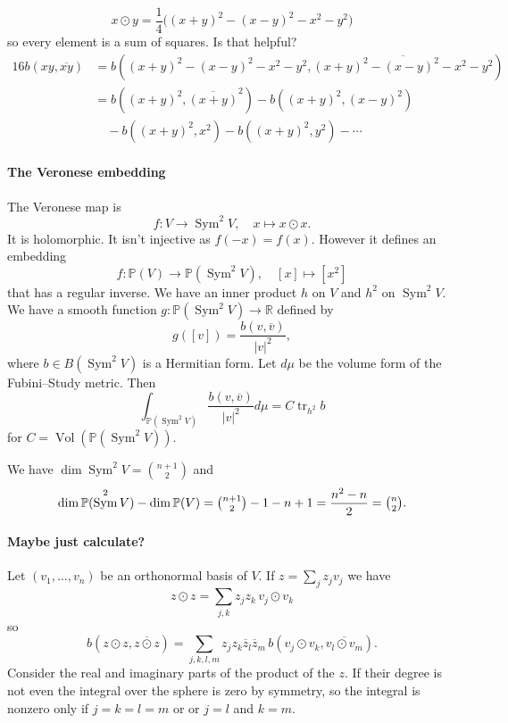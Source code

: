 \documentclass[11pt]{article}
\theoremstyle{definition}
\newcommand{\kk}[1]{\mathbb{#1}}
\def\ov#1{\overline{#1}}
\DeclareMathOperator{\Vol}{Vol}
\DeclareMathOperator{\Sym}{Sym}
\DeclareMathOperator{\tr}{tr}
\begin{document}
$$
x \odot y
= \frac14 \bigl( (x + y)^2 - (x - y)^2 - x^2 - y^2 \bigr)
$$
so every element is a sum of squares.
Is that helpful?
\begin{align*}
16 b(xy, \ov{xy})
&= b((x{+}y)^2 - (x{-}y)^2 - x^2 - y^2, \ov{(x{+}y)^2 - (x{-}y)^2 - x^2 - y^2})
\\
&= b((x+y)^2, \ov{(x+y)}^2)
- b((x+y)^2,(x-y)^2)
\\
&\quad
- b((x+y)^2,x^2)
- b((x+y)^2,y^2)
- \cdots
\end{align*}

\paragraph{The Veronese embedding}

The Veronese map is
$$
f : V \to \Sym^2 V,
\quad
x \mapsto x \odot x.
$$
It is holomorphic.
It isn't injective as $f(- x) = f(x)$.
However it defines an embedding
$$
f : \kk P(V) \to \kk P(\Sym^2 V),
\quad
[x] \mapsto [x^2]
$$
that has a regular inverse.
We have an inner product $h$ on $V$ and $h^2$ on $\Sym^2 V$.
We have a smooth function $g : \kk P(\Sym^2 V) \to \kk R$ defined by
$$
g([v]) = \frac{b(v, \ov{v})}{|v|^2},
$$
where $b \in B(\Sym^2 V)$ is a Hermitian form.
Let $d\mu$ be the volume form of the Fubini--Study metric.
Then
$$
\int_{\kk P(\Sym^2 V)} \frac{b(v, \ov v)}{|v|^2} d\mu
= C \tr_{h^2} b
$$
for $C = \Vol(\kk P(\Sym^2 V))$.

We have $\dim \Sym^2 V = \binom{n+1}2$ and
$$
\dim \kk P(\Sym^2 V) - \dim \kk P(V)
= \tbinom{n+1}{2} - 1 - n + 1
= \frac{n^2 - n}{2}
= \tbinom{n}{2}.
$$



\paragraph{Maybe just calculate?}


Let $(v_1, \ldots, v_n)$ be an orthonormal basis of $V$.
If $z = \sum_j z_j v_j$ we have
$$
z \odot z
= \sum_{j,k} z_j z_k \, v_j \odot v_k
$$
so
$$
b(z \odot z, \ov{z \odot z})
= \sum_{j,k,l,m} z_j z_k \ov z_l \ov z_m
\, b(v_j \odot v_k, \ov{v_l \odot v_m}).
$$
Consider the real and imaginary parts of the product of the $z$.
If their degree is not even the integral over the sphere is zero by symmetry,
so the integral is nonzero only if $j = k = l = m$ or or $j = l$ and $k = m$.
\end{document}
